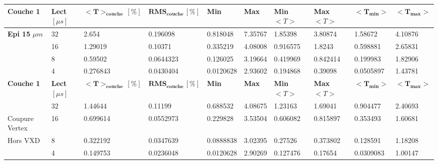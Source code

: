   \medskip
  
\begin{table}
\small
\centering
\begin{tabular}{|l|l|l|l|l|l|l|l|l|l|}
\hline
\textbf{Couche 1} & \textbf{Lect} $[\mu s]$ & $\mathbf{<T>_{couche} \, [\%]}$ & $\mathbf{RMS_{couche} \, [\%]}$ & \textbf{Min} & \textbf{Max} & \textbf{Min} $<T>$ & \textbf{Max} $<T>$ & $\mathbf{<T_{min}>}$ & $\mathbf{<T_{max}>}$ \\ \hline
  \textbf{Epi 15} $\mu m$     & 32            & 2.654                    & 0.196098                & 0.818048  & 7.35767   & 1.85398      & 3.80874       & 1.58672         & 4.10876         \\ \hline
                              & 16            & 1.29019                  & 0.10371                 & 0.335219  & 4.08008   & 0.916575      & 1.8243        & 0.598881        & 2.65831         \\ \hline
                              & 8             & 0.59502                  & 0.0644323               & 0.126025  & 3.19664   & 0.419969      & 0.842414      & 0.199983        & 1.82906         \\ \hline
                              & 4             & 0.276843                 & 0.0430404               & 0.0120628 & 2.93602   & 0.194868      & 0.39098       & 0.0505897       & 1.43781         \\ \hline
\textbf{Couche 1} & \textbf{Lect} $[\mu s]$ & $\mathbf{<T>_{couche} \, [\%]}$ & $\mathbf{RMS_{couche} \, [\%]}$ & \textbf{Min} & \textbf{Max} & \textbf{Min} $<T>$ & \textbf{Max} $<T>$ & $\mathbf{<T_{min}>}$ & $\mathbf{<T_{max}>}$ \\ \hline
                              & 32            & 1.44644                  & 0.11199                 & 0.688532  & 4.08675   & 1.23163       & 1.69041       & 0.904477        & 2.40693         \\ \hline
Coupure Vertex                & 16            & 0.699614                 & 0.0552973               & 0.229828  & 3.53504   & 0.606082      & 0.815897      & 0.353493        & 1.60681         \\ \hline
Hors VXD                      & 8             & 0.322192                 & 0.0347639               & 0.0888838 & 3.02395   & 0.27526       & 0.373802      & 0.128591        & 1.18208         \\ \hline
                              & 4             & 0.149753                 & 0.0236048               & 0.0120628 & 2.90269   & 0.127476      & 0.17654       & 0.0309083       & 1.00147         \\ \hline

\end{tabular}
\end{table}
